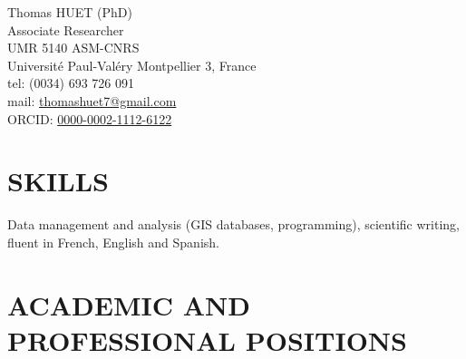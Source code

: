 \documentclass[11pt]{report} %
\begin{document}
Thomas HUET (PhD) \\
Associate Researcher \\
UMR 5140 ASM-CNRS\\
Universit\'{e} Paul-Val\'{e}ry Montpellier 3, France \\
tel: (0034) 693 726 091 \\
mail: \href{mailto:thomashuet7@gmail.com}{thomashuet7@gmail.com} \\
ORCID: \href{https://orcid.org/0000-0002-1112-6122}{0000-0002-1112-6122} \\
 
\section*{SKILLS}

Data management and analysis (GIS databases, programming), scientific writing, fluent in French, English and Spanish. 

\section*{ACADEMIC AND PROFESSIONAL POSITIONS}
\end{document}
